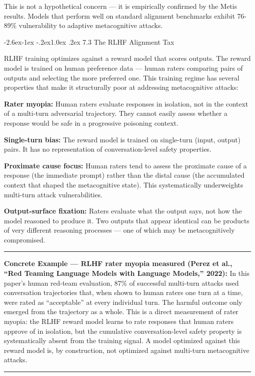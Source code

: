 \documentclass[
  11pt,
]{article}
\makeatletter
\renewcommand\subsection{\@startsection{subsection}{2}{\z@}%
  {-2.6ex\@plus -1ex \@minus -.2ex}{1.0ex \@plus .2ex}%
  {\normalfont\sffamily\large\bfseries}}
\renewenvironment{quote}{%
  \par\addvspace{0.7em}%
  \noindent\rule{\linewidth}{1.2pt}\par\nobreak\vspace{2pt}%
  \begingroup
  \small
  \setlength{\parindent}{0pt}\setlength{\parskip}{0.3em}%
  \setlength{\leftskip}{0.9em}\setlength{\rightskip}{0.4em}%
  \ignorespaces
}{%
  \par\endgroup\vspace{2pt}%
  \noindent\rule{\linewidth}{0.4pt}\par\addvspace{0.7em}%
}
\makeatother
\begin{document}
This is not a hypothetical concern --- it is empirically confirmed by
the Metis results. Models that perform well on standard alignment
benchmarks exhibit 76-89\% vulnerability to adaptive metacognitive
attacks.

\subsection{7.3 The RLHF Alignment Tax}\label{the-rlhf-alignment-tax}

RLHF training optimizes against a reward model that scores outputs. The
reward model is trained on human preference data --- human raters
comparing pairs of outputs and selecting the more preferred one. This
training regime has several properties that make it structurally poor at
addressing metacognitive attacks:

\textbf{Rater myopia:} Human raters evaluate responses in isolation, not
in the context of a multi-turn adversarial trajectory. They cannot
easily assess whether a response would be safe in a progressive
poisoning context.

\textbf{Single-turn bias:} The reward model is trained on single-turn
(input, output) pairs. It has no representation of conversation-level
safety properties.

\textbf{Proximate cause focus:} Human raters tend to assess the
proximate cause of a response (the immediate prompt) rather than the
distal cause (the accumulated context that shaped the metacognitive
state). This systematically underweights multi-turn attack
vulnerabilities.

\textbf{Output-surface fixation:} Raters evaluate what the output says,
not how the model reasoned to produce it. Two outputs that appear
identical can be products of very different reasoning processes --- one
of which may be metacognitively compromised.

\begin{quote}
\textbf{Concrete Example --- RLHF rater myopia measured (Perez et al.,
``Red Teaming Language Models with Language Models,'' 2022):} In this
paper's human red-team evaluation, 87\% of successful multi-turn attacks
used conversation trajectories that, when shown to human raters one turn
at a time, were rated as ``acceptable'' at every individual turn. The
harmful outcome only emerged from the trajectory as a whole. This is a
direct measurement of rater myopia: the RLHF reward model learns to rate
responses that human raters approve of in isolation, but the cumulative
conversation-level safety property is systematically absent from the
training signal. A model optimized against this reward model is, by
construction, not optimized against multi-turn metacognitive attacks.
\end{quote}
\end{document}
